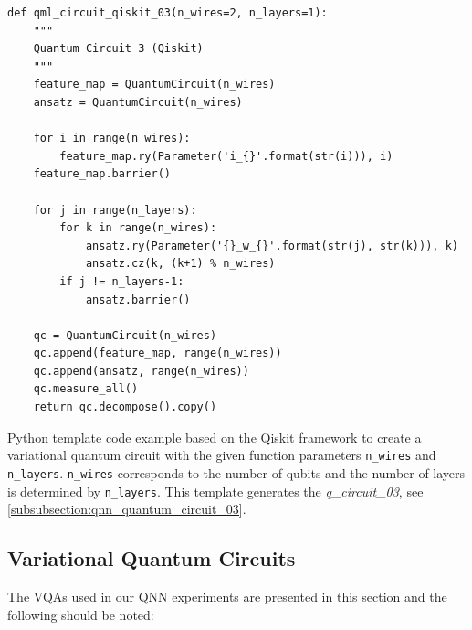 \begin{listing}[!ht]
    \begin{verbatim}
def qml_circuit_qiskit_03(n_wires=2, n_layers=1):
    """
    Quantum Circuit 3 (Qiskit)
    """
    feature_map = QuantumCircuit(n_wires)
    ansatz = QuantumCircuit(n_wires)

    for i in range(n_wires):
        feature_map.ry(Parameter('i_{}'.format(str(i))), i)
    feature_map.barrier()

    for j in range(n_layers):
        for k in range(n_wires):
            ansatz.ry(Parameter('{}_w_{}'.format(str(j), str(k))), k)
            ansatz.cz(k, (k+1) % n_wires)
        if j != n_layers-1:
            ansatz.barrier()

    qc = QuantumCircuit(n_wires)
    qc.append(feature_map, range(n_wires))
    qc.append(ansatz, range(n_wires))
    qc.measure_all()
    return qc.decompose().copy()
    \end{verbatim}
    \caption{Python template code example based on the Qiskit framework\cite{Qiskit} to create a variational quantum circuit with the given function parameters \texttt{n_wires} and \texttt{n_layers}. \texttt{n_wires} corresponds to the number of qubits and the number of layers is determined by \texttt{n_layers}. This template generates the \textit{q\_circuit\_03}, see \ref{subsubsection:qnn_quantum_circuit_03}.}
    \label{listing:example_template_code_q_circuit_03}
\end{listing}

\clearpage

\subsection{Variational Quantum Circuits}
\label{subsection:qnn_quantum_circuits}

The VQAs used in our QNN experiments are presented in this section and the following should be noted:

